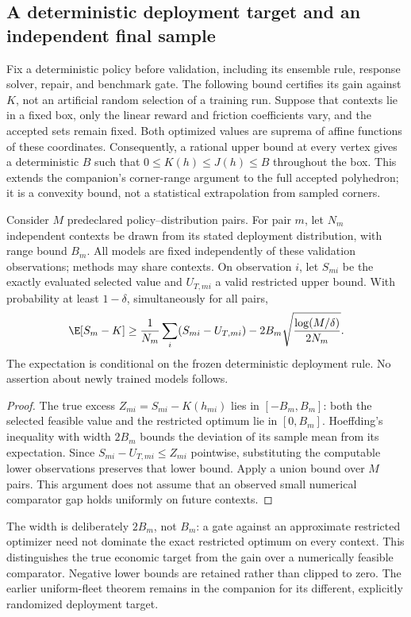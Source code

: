 \subsection{A deterministic deployment target and an independent final sample}
Fix a deterministic policy before validation, including its ensemble rule, response solver, repair, and benchmark gate. The following bound certifies its gain against $K$, not an artificial random selection of a training run. Suppose that contexts lie in a fixed box, only the linear reward and friction coefficients vary, and the accepted sets remain fixed. Both optimized values are suprema of affine functions of these coordinates. Consequently, a rational upper bound at every vertex gives a deterministic $B$ such that
$0\leq K(h)\leq J(h)\leq B$ throughout the box. This extends the companion's corner-range argument to the full accepted polyhedron; it is a convexity bound, not a statistical extrapolation from sampled corners.

\begin{proposition}\label{prop:r21-validation}
Consider $M$ predeclared policy--distribution pairs. For pair $m$, let $N_m$ independent contexts be drawn from its stated deployment distribution, with range bound $B_m$. All models are fixed independently of these validation observations; methods may share contexts. On observation $i$, let $S_{mi}$ be the exactly evaluated selected value and $U_{T,mi}$ a valid restricted upper bound. With probability at least $1-\delta$, simultaneously for all pairs,
\begin{equation}\label{eq:r21-validation}
 \E[S_m-K]\geq\frac1{N_m}\sum_i(S_{mi}-U_{T,mi})
 -2B_m\sqrt{\frac{\log(M/\delta)}{2N_m}}.
\end{equation}
The expectation is conditional on the frozen deterministic deployment rule. No assertion about newly trained models follows.
\end{proposition}
\begin{proof}
The true excess $Z_{mi}=S_{mi}-K(h_{mi})$ lies in $[-B_m,B_m]$: both the selected feasible value and the restricted optimum lie in $[0,B_m]$. Hoeffding's inequality with width $2B_m$ bounds the deviation of its sample mean from its expectation. Since $S_{mi}-U_{T,mi}\leq Z_{mi}$ pointwise, substituting the computable lower observations preserves that lower bound. Apply a union bound over $M$ pairs. This argument does not assume that an observed small numerical comparator gap holds uniformly on future contexts.
\end{proof}
The width is deliberately $2B_m$, not $B_m$: a gate against an approximate restricted optimizer need not dominate the exact restricted optimum on every context. This distinguishes the true economic target from the gain over a numerically feasible comparator. Negative lower bounds are retained rather than clipped to zero. The earlier uniform-fleet theorem remains in the companion for its different, explicitly randomized deployment target.
